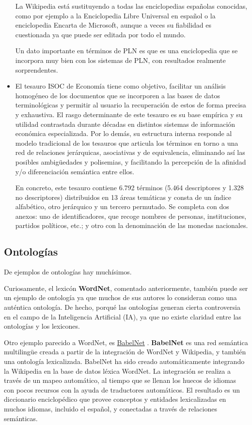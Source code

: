 \documentclass[11pt]{exam}
\begin{document}
\begin{questions}
\begin{itemize}
	La Wikipedia está sustituyendo a todas las enciclopedias españolas conocidas, como por ejemplo a la Enciclopedia Libre Universal en español o la enciclopedia Encarta de Microsoft, aunque a veces su fiabilidad es cuestionada ya que puede ser editada por todo el mundo.
	
	Un dato importante en términos de PLN es que es una enciclopedia que se incorpora muy bien con los sistemas de PLN, con resultados realmente sorprendentes.
	
	\item El tesauro ISOC de Economía tiene como objetivo, facilitar un análisis homogéneo de los documentos que se incorporen a las bases de datos terminológicas y permitir al usuario la recuperación de estos de forma precisa y exhaustiva. El rasgo determinante de este tesauro es su base empírica y su utilidad contrastada durante décadas en distintos sistemas de información económica especializada. Por lo demás, su estructura interna responde al modelo tradicional de los tesauros que articula los términos en torno a una red de relaciones jerárquicas, asociativas y de equivalencia, eliminando así las posibles ambigüedades y polisemias, y facilitando la percepción de la afinidad y/o diferenciación semántica entre ellos. 
	
	En concreto, este tesauro contiene 6.792 términos (5.464 descriptores y 1.328 no descriptores) distribuidos en 13 áreas temáticas y consta de un índice alfabético, otro jerárquico y un tercero permutado. Se completa con dos anexos: uno de identificadores, que recoge nombres de personas, instituciones, partidos políticos, etc.; y otro con la denominación de las monedas nacionales. 
	 
\end{itemize}

\subsection*{Ontologías}

De ejemplos de ontologías hay muchísimos.

Curiosamente, el lexicón {\bf WordNet}, comentado anteriormente, también puede ser un ejemplo de ontología ya que muchos de sus autores lo consideran como una auténtica ontología. De hecho, porqué las ontologías generan cierta controversia en el campo de la Inteligencia Artificial (IA), ya que no existe claridad entre las ontologías y los lexicones.

Otro ejemplo parecido a WordNet, es \href{https://babelnet.org/}{BabelNet} . {\bf BabelNet} es una red semántica multilingüe creada a partir de la integración de WordNet y Wikipedia, y también una ontología lexicalizada. BabelNet ha sido creado automáticamente integrando la Wikipedia en la base de datos léxica WordNet. La integración se realiza a través de un mapeo automático, al tiempo que se llenan los huecos de idiomas con pocos recursos con la ayuda de traductores automáticos. El resultado es un diccionario enciclopédico que provee conceptos y entidades lexicalizadas en muchos idiomas, incluido el español, y conectadas a través de relaciones semánticas. 


\end{questions}
\end{document}
